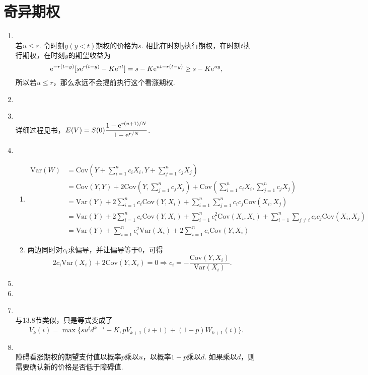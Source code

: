 \section{奇异期权}
\begin{enumerate}[label=\arabic{section}.\arabic*]
    \item \pro\\
    若$u \leq r$. 令时刻$y(y<t)$期权的价格为$s$. 相比在时刻$y$执行期权，在时刻$t$执行期权，在时刻$y$的期望收益为
    \[\mathrm{e}^{-r(t-y)}[s\mathrm{e}^{r(t-y)}-K\mathrm{e}^{ut}]=s-K\mathrm{e}^{ut-r(t-y)} \geq s-K\mathrm{e}^{uy},\]
    所以若$u \leq r$，那么永远不会提前执行这个看涨期权.
    \item \omitted
    \item \sol\\
    详细过程见书，$\displaystyle E(V)=S(0)\frac{1-\mathrm{e}^{r(n+1)/N}}{1-\mathrm{e}^{r/N}}$.
    \item \pro
    \begin{enumerate}[label=\alph*)]
        \item \begin{align*}
            \mathrm{Var}(W) & = \mathrm{Cov}\left(Y+\sum_{i=1}^n c_iX_i,Y+\sum_{j=1}^n c_jX_j\right)\\
            & = \mathrm{Cov}(Y,Y) + 2\mathrm{Cov}\left(Y,\sum_{j=1}^n c_jX_j\right)+\mathrm{Cov}\left(\sum_{i=1}^n c_iX_i,\sum_{j=1}^n c_jX_j\right)\\
            &=\mathrm{Var}(Y)+2\sum_{i=1}^n c_i\mathrm{Cov}(Y,X_i)+\sum_{i=1}^n\sum_{j=1}^n c_ic_j \mathrm{Cov}(X_i,X_j)\\
            &=\mathrm{Var}(Y)+2\sum_{i=1}^n c_i\mathrm{Cov}(Y,X_i)+\sum_{i=1}^nc_i^2 \mathrm{Cov}(X_i,X_i)+\sum_{i=1}^n\sum_{j \neq i} c_ic_j \mathrm{Cov}(X_i,X_j)\\
            &=\mathrm{Var}(Y)+\sum_{i=1}^nc_i^2 \mathrm{Var}(X_i)+2\sum_{i=1}^n c_i\mathrm{Cov}(Y,X_i)
        \end{align*}
        \item 两边同时对$c_i$求偏导，并让偏导等于0，可得
        \[2c_i\mathrm{Var}(X_i)+2\mathrm{Cov}(Y,X_i)=0 \Rightarrow c_i=-\frac{\mathrm{Cov}(Y,X_i)}{\mathrm{Var}(X_i)}.\]
    \end{enumerate}
    \item \omitted
    \item \omitted
    \item \sol\\
    与13.8节类似，只是等式变成了
    \[V_k(i)=\max\{su^id^{k-i} - K, pV_{k+1}(i + 1) + (1-p)W_{k+1}(i)\}.\]
    \item \sol\\
    障碍看涨期权的期望支付值以概率$p$乘以$u$，以概率$1-p$乘以$d$. 如果乘以$d$，则需要确认新的价格是否低于障碍值.
\end{enumerate}
\clearpage